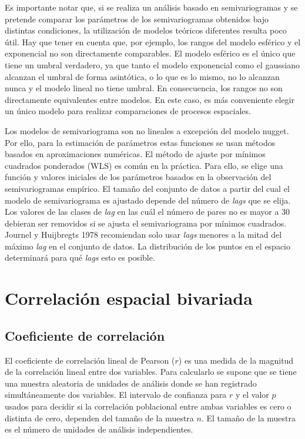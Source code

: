 \documentclass[11pt,b5paper,]{krantz}
\begin{document}
Es importante notar que, si se realiza un análisis basado en
semivariogramas y se pretende comparar los parámetros de los
semivariogramas obtenidos bajo distintas condiciones, la utilización de
modelos teóricos diferentes resulta poco útil. Hay que tener en cuenta
que, por ejemplo, los rangos del modelo esférico y el exponencial no son
directamente comparables. El modelo esférico es el único que tiene un
umbral verdadero, ya que tanto el modelo exponencial como el gaussiano
alcanzan el umbral de forma asintótica, o lo que es lo mismo, no lo
alcanzan nunca y el modelo lineal no tiene umbral. En consecuencia, los
rangos no son directamente equivalentes entre modelos. En este caso, es
más conveniente elegir un único modelo para realizar comparaciones de
procesos espaciales.

Los modelos de semivariograma son no lineales a excepción del modelo
nugget. Por ello, para la estimación de parámetros estas funciones se
usan métodos basados en aproximaciones numéricas. El método de ajuste
por mínimos cuadrados ponderados (WLS) es común en la práctica. Para
ello, se elige una función y valores iniciales de los parámetros basados
en la observación del semivariogramas empírico. El tamaño del conjunto
de datos a partir del cual el modelo de semivariograma es ajustado
depende del número de \emph{lags} que se elija. Los valores de las
clases de \emph{lag} en las cuál el número de pares no es mayor a 30
debieran ser removidos si se ajusta el semivariograma por mínimos
cuadrados. Journel y Huijbregts 1978 recomiendan solo usar \emph{lags}
menores a la mitad del máximo \emph{lag} en el conjunto de datos. La
distribución de los puntos en el espacio determinará para qué
\emph{lags} esto es posible.

\section{Correlación espacial
bivariada}\label{correlaciuxf3n-espacial-bivariada}

\subsection{Coeficiente de
correlación}\label{coeficiente-de-correlaciuxf3n}

El coeficiente de correlación lineal de Pearson (\(r\)) es una medida de
la magnitud de la correlación lineal entre dos variables. Para
calcularlo se supone que se tiene una muestra aleatoria de unidades de
análisis donde se han registrado simultáneamente dos variables. El
intervalo de confianza para \(r\) y el valor \(p\) usados para decidir
si la correlación poblacional entre ambas variables es cero o distinta
de cero, dependen del tamaño de la muestra \(n\). El tamaño de la
muestra es el número de unidades de análisis independientes.
\end{document}
